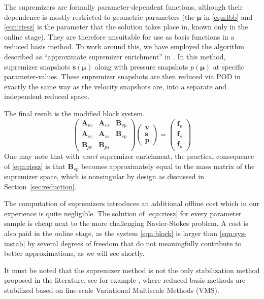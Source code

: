 \documentclass[onecolumn, twoside, a4paper, 11pt]{article}
\begin{document}
The supremizers are formally parameter-dependent functions, although their
dependence is mostly restricted to geometric parameters (the $\bm \mu$ in
\eqref{eqn:lbb} and \eqref{eqn:riesz} is the parameter that the solution takes
place in, known only in the online stage). They are therefore unsuitable for use
as basis functions in a reduced basis method. To work around this, we have
employed the algorithm described as ``approximate supremizer enrichment'' in
\cite[4.2.3]{Ballarin2015ssp}. In this method, supremizer snapshots $\bm s(\bm
\mu)$ along with pressure snapshots $p(\bm \mu)$ at specific parameter-values.
These supremizer snapshots are then reduced via POD in exactly the same way as
the velocity snapshots are, into a separate and independent reduced space.

The final result is the modified block system.
\begin{equation}
  \label{eqn:block}
  \begin{pmatrix}
    \bm A_{vv} & \bm A_{vs} & \bm B_{vp} \\
    \bm A_{sv} & \bm A_{ss} & \bm B_{sp} \\
    \bm B_{pv} & \bm B_{ps} & \end{pmatrix}
  \begin{pmatrix} \bm v \\ \bm s \\ \bm p \end{pmatrix}
  =
  \begin{pmatrix} \bm f_v \\ \bm f_s \\ \bm f_p \end{pmatrix}
\end{equation}
One may note that with \emph{exact} supremizer enrichment, the practical
consequence of \eqref{eqn:riesz} is that $\bm B_{sp}$ becomes approximately
equal to the mass matrix of the supremizer space, which is nonsingular by
design as discussed in Section~\ref{sec:reduction}.

The computation of supremizers introduces an additional offline cost which in
our experience is quite negligible. The solution of \eqref{eqn:riesz} for every
parameter sample is cheap next to the more challenging Navier-Stokes problem. A
cost is also paid in the online stage, as the system \eqref{eqn:block} is larger
than \eqref{eqn:sys-instab} by several degrees of freedom that do not
meaningfully contribute to better approximations, as we will see shortly.

It must be noted that the supremizer method is not the only stabilization method
proposed in the literature, see for example
\cite{Weller2008nml,Bergmann2009erp}, where reduced basis methods are stabilized
based on fine-scale Variational Multiscale Methods (VMS).
\end{document}
